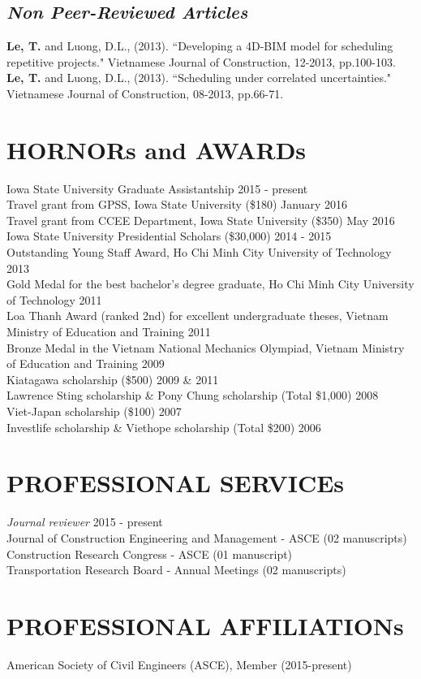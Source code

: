 \documentclass[11pt]{article}
\begin{document}
\subsection*{\sl Non Peer-Reviewed Articles}
{\bf Le, T.} and Luong, D.L., (2013). ``Developing a 4D-BIM model for scheduling repetitive projects." Vietnamese Journal of Construction, 12-2013, pp.100-103.\\
{\bf Le, T.} and Luong, D.L., (2013). ``Scheduling under correlated uncertainties." Vietnamese Journal of Construction, 08-2013, pp.66-71.
\section*{HORNORs and AWARDs}
Iowa State University Graduate Assistantship \hfill 2015 - present\\
Travel grant from GPSS, Iowa State University (\$180) \hfill January 2016\\
Travel grant from CCEE Department, Iowa State University (\$350) \hfill May 2016\\
Iowa State University Presidential Scholars (\$30,000) \hfill 2014 - 2015\\
Outstanding Young Staff Award, Ho Chi Minh City University of Technology \hfill 2013\\
Gold Medal for the best bachelor's degree graduate, Ho Chi Minh City University of Technology \hfill 2011\\
Loa Thanh Award (ranked 2nd) for excellent undergraduate theses, Vietnam Ministry of Education and Training \hfill 2011\\
Bronze Medal in the Vietnam National Mechanics Olympiad, Vietnam Ministry of Education and Training \hfill 2009\\
Kiatagawa scholarship (\$500) \hfill 2009 \& 2011\\
Lawrence Sting scholarship \& Pony Chung scholarship (Total \$1,000) \hfill 2008\\
Viet-Japan scholarship (\$100) \hfill 2007\\
Investlife scholarship \& Viethope scholarship (Total \$200) \hfill 2006
\section*{PROFESSIONAL SERVICEs}
{\sl Journal reviewer} \hfill 2015 - present\\
Journal of Construction Engineering and Management - ASCE (02 manuscripts)\\
Construction Research Congress - ASCE (01 manuscript)\\
Transportation Research Board - Annual Meetings (02 manuscripts)

\section*{PROFESSIONAL AFFILIATIONs}
American Society of Civil Engineers (ASCE), Member (2015-present)
 


\end{document}

